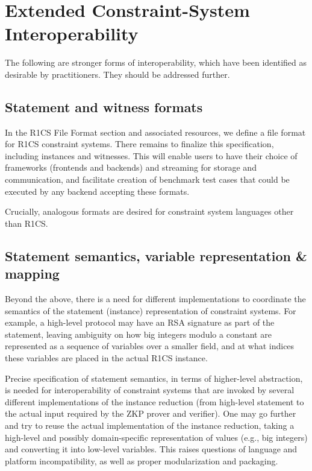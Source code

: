 \section{Extended Constraint-System Interoperability}
\label{implem:interoperability}

The following are stronger forms of interoperability, which have been identified as desirable by practitioners.
They should be addressed further.


\subsection{Statement and witness formats}
\label{implem:interoperability:format-statement-and-witness}

In the R1CS File Format section and associated resources, we define a file format for R1CS constraint systems.
There remains to finalize this specification, including instances and witnesses.
This will enable users to have their choice of frameworks (frontends and backends) and streaming for storage and communication, and facilitate creation of benchmark test cases that could be executed by any backend accepting these formats.
 
Crucially, analogous formats are desired for constraint system languages other than R1CS.


\subsection{Statement semantics, variable representation \& mapping}

Beyond the above, there is a need for different implementations to coordinate the semantics of the statement (instance) representation of constraint systems.
For example, a high-level protocol may have an RSA signature as part of the statement, leaving ambiguity on how big integers modulo a constant are represented as a sequence of variables over a smaller field, and at what indices these variables are placed in the actual R1CS instance.

Precise specification of statement semantics, in terms of higher-level abstraction, is needed for interoperability of constraint systems that are invoked by several different implementations of the instance reduction (from high-level statement to the actual input required by the ZKP prover and verifier).
One may go further and try to reuse the actual implementation of the instance reduction, taking a high-level and possibly domain-specific representation of values (e.g., big  integers) and converting it into low-level variables.
This raises questions of language and platform incompatibility, as well as proper modularization and packaging.

